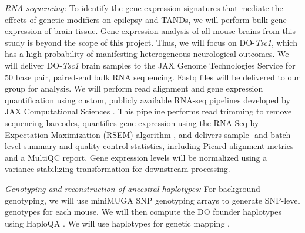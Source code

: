 \documentclass[
  12pt,
]{article}
\begin{document}
\textit{\underline{RNA sequencing:}} To identify the gene expression
signatures that mediate the effects of genetic modifiers on epilepsy and
TANDs, we will perform bulk gene expression of brain tissue. Gene
expression analysis of all mouse brains from this study is beyond the
scope of this project. Thus, we will focus on DO-\textit{Tsc1}, which
has a high probability of manifesting heterogeneous neurological
outcomes. We will deliver DO-\textit{Tsc1} brain samples to the JAX
Genome Technologies Service for 50 base pair, paired-end bulk RNA
sequencing. Fastq files will be delivered to our group for analysis. We
will perform read alignment and gene expression quantification using
custom, publicly available RNA-seq pipelines developed by JAX
Computational Sciences \cite{jax_github}. This pipeline performs read
trimming to remove sequencing barcodes, quantifies gene expression using
the RNA-Seq by Expectation Maximization (RSEM) algorithm
\cite{21816040}, and delivers sample- and batch-level summary and
quality-control statistics, including Picard alignment metrics
\cite{picard} and a MultiQC \cite{27312411} report. Gene expression
levels will be normalized using a variance-stabilizing transformation
\cite{25516281, 23497356} for downstream processing.

\textit{\underline{Genotyping and reconstruction of ancestral haplotypes:}}
For background genotyping, we will use miniMUGA SNP genotyping arrays
\cite{33067325} to generate SNP-level genotypes for each mouse. We will
then compute the DO founder haplotypes using HaploQA \cite{haploQA}. We
will use haplotypes for genetic mapping \cite{25237114}.
\end{document}
